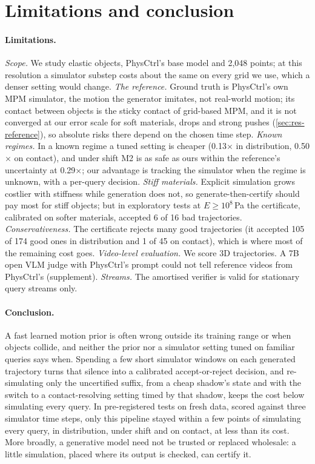\section{Limitations and conclusion}
\label{sec:conclusion}

\paragraph{Limitations.}
\emph{Scope.} We study elastic objects, PhysCtrl's base model and 2{,}048 points; at this resolution a simulator substep costs about the same on every grid we use, which a denser setting would change.
\emph{The reference.} Ground truth is PhysCtrl's own MPM simulator, the motion the generator imitates, not real-world motion; its contact between objects is the sticky contact of grid-based MPM, and it is not converged at our error scale for soft materials, drops and strong pushes (\cref{sec:res-reference}), so absolute risks there depend on the chosen time step.
\emph{Known regimes.} In a known regime a tuned setting is cheaper (0.13$\times$ in distribution, 0.50$\times$ on contact), and under shift M2 is as safe as ours within the reference's uncertainty at 0.29$\times$; our advantage is tracking the simulator when the regime is unknown, with a per-query decision.
\emph{Stiff materials.} Explicit simulation grows costlier with stiffness while generation does not, so generate-then-certify should pay most for stiff objects; but in exploratory tests at $E \ge 10^8$\,Pa the certificate, calibrated on softer materials, accepted 6 of 16 bad trajectories.
\emph{Conservativeness.} The certificate rejects many good trajectories (it accepted 105 of 174 good ones in distribution and 1 of 45 on contact), which is where most of the remaining cost goes.
\emph{Video-level evaluation.} We score 3D trajectories. A 7B open VLM judge with PhysCtrl's prompt could not tell reference videos from PhysCtrl's (supplement).
\emph{Streams.} The amortised verifier is valid for stationary query streams only.

\paragraph{Conclusion.}
A fast learned motion prior is often wrong outside its training range or when objects collide, and neither the prior nor a simulator setting tuned on familiar queries says when.
Spending a few short simulator windows on each generated trajectory turns that silence into a calibrated accept-or-reject decision, and re-simulating only the uncertified suffix, from a cheap shadow's state and with the switch to a contact-resolving setting timed by that shadow, keeps the cost below simulating every query.
In pre-registered tests on fresh data, scored against three simulator time steps, only this pipeline stayed within a few points of simulating every query, in distribution, under shift and on contact, at less than its cost.
More broadly, a generative model need not be trusted or replaced wholesale: a little simulation, placed where its output is checked, can certify it.
